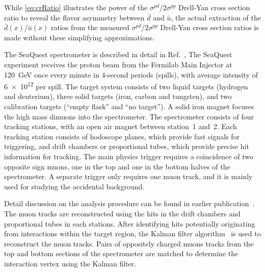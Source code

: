 \documentclass[reprint,aps,unsortedaddress,superscriptaddress,prl,floatfix,showpacs,linenumbers]{revtex4-2}
\begin{document}
While \cref{eq:crRatio} illustrates the power of the $\sigma^{pd}/2\sigma^{pp}$ Drell-Yan cross section
ratio to reveal the flavor asymmetry between $\bar{d}$ and $\bar{u}$,
the actual extraction of the $\bar{d}\left(x\right) / \bar{u}\left(x\right)$
ratios from the measured $\sigma^{pd}/ 2 \sigma^{pp}$ Drell-Yan cross
section ratios is made without these simplifying approximations.

The SeaQuest spectrometer is  described in detail in Ref.~\cite{aidala2019},
The SeaQuest experiment receives the  proton beam from the Fermilab Main
Injector at \SI{120}{\GeV}
once every minute in 4-second periods (spills), with average intensity
of \num{6e12} per spill.
The target system consists of two liquid targets (hydrogen and deuterium),
three solid targets (iron, carbon and tungsten), and two calibration
targets (``empty flask'' and ``no target'').
A solid iron magnet focuses the high mass dimuons into the spectrometer.
The spectrometer consists of four tracking stations, with an open
air magnet between station~1 and~2.
Each tracking station consists of hodoscope planes, which
provide fast signals for triggering,
and drift chambers or proportional tubes, which provide precise
hit information for tracking.
The main physics trigger requires a coincidence of two opposite sign muons,
one in the top and one in the bottom halves of the spectrometer.
A separate trigger only requires one muon track, and it is mainly used
for studying the accidental background.

Detail discussion on the analysis procedure can be found in earlier publication~\cite{dove2021,dove2023}.
The muon tracks are reconstructed using the hits in the drift chambers and proportional tubes in each stations.
After identifying hits potentially originating from interactions within the target region,
the Kalman filter algorithm~\cite{kalman1960} is used to reconstruct the muon tracks.
Pairs of oppositely charged muons tracks from the top and bottom sections of the spectrometer are
matched to determine the interaction vertex using the Kalman filter.
\end{document}
